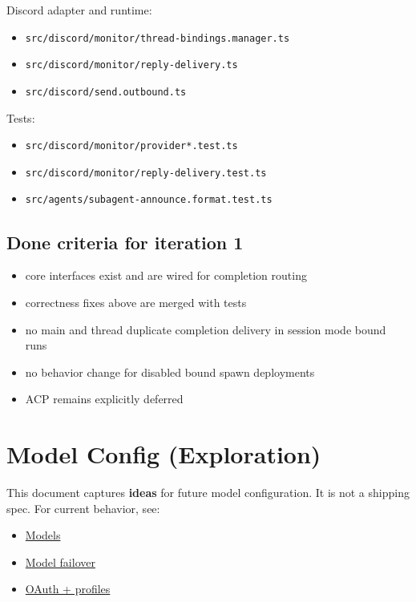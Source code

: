 Discord adapter and runtime:

\begin{itemize}
  \item \texttt{src/discord/monitor/thread-bindings.manager.ts}
  \item \texttt{src/discord/monitor/reply-delivery.ts}
  \item \texttt{src/discord/send.outbound.ts}
\end{itemize}


Tests:

\begin{itemize}
  \item \texttt{src/discord/monitor/provider*.test.ts}
  \item \texttt{src/discord/monitor/reply-delivery.test.ts}
  \item \texttt{src/agents/subagent-announce.format.test.ts}
\end{itemize}


\subsection{Done criteria for iteration 1}


\begin{itemize}
  \item core interfaces exist and are wired for completion routing
  \item correctness fixes above are merged with tests
  \item no main and thread duplicate completion delivery in session mode bound runs
  \item no behavior change for disabled bound spawn deployments
  \item ACP remains explicitly deferred
\end{itemize}



\clearpage

\section{Model Config (Exploration)}


This document captures \textbf{ideas} for future model configuration. It is not a
shipping spec. For current behavior, see:

\begin{itemize}
  \item \href{/concepts/models}{Models}
  \item \href{/concepts/model-failover}{Model failover}
  \item \href{/concepts/oauth}{OAuth + profiles}
\end{itemize}


